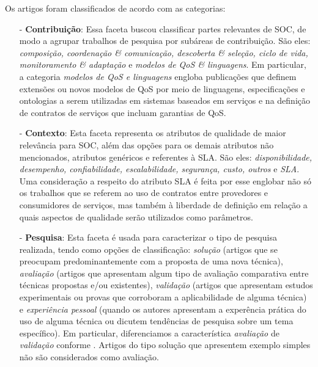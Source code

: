 Os artigos foram classificados de acordo com as categorias:
\begin{itemize}
\item[-] \textbf{Contribuição}: Essa faceta buscou classificar partes relevantes de SOC, de modo a agrupar trabalhos de pesquisa por subáreas de contribuição. São eles: \emph{composição, coordenação \& comunicação, descoberta \& seleção, ciclo de vida, monitoramento \& adaptação} e  \emph{modelos de QoS \& linguagens}. Em particular, a categoria \emph{modelos de QoS e linguagens} engloba publicações que definem extensões ou novos modelos de QoS por meio de linguagens, especificações e ontologias a serem utilizadas em sistemas baseados em serviços e na definição de contratos de serviços que incluam garantias de QoS.

\item[-] \textbf{Contexto}: Esta faceta representa os atributos de qualidade de maior relevância para SOC, além das opções para os demais atributos não mencionados, atributos genéricos e referentes à SLA. São eles: \emph{disponibilidade, desempenho, confiabilidade, escalabilidade, segurança, custo, outros} e \emph{SLA}. Uma consideração a respeito do atributo SLA é feita por esse englobar não só os trabalhos que se referem ao uso de contratos entre provedores e consumidores de serviços, mas também à liberdade de definição em relação a quais aspectos de qualidade serão utilizados como parâmetros.

\item[-] \textbf{Pesquisa}: Esta faceta \'{e} usada para caracterizar o tipo de pesquisa realizada, tendo como op\c c\~{o}es de classifica\c c\~{a}o: 
\emph{solu\c c\~{a}o} (artigos que se preocupam predominantemente com a proposta de uma nova t\'{e}cnica), \emph{avalia\c c\~{a}o} (artigos que apresentam 
algum tipo de avalia\c c\~{a}o comparativa entre t\'{e}cnicas propostas e/ou existentes), \emph{validação} (artigos que apresentam 
estudos experimentais ou provas que corroboram a aplicabilidade de alguma t\'{e}cnica) e \emph{experiência pessoal} (quando os autores 
apresentam a exper\^{e}ncia pr\'{a}tica do uso de alguma t\'{e}cnica ou dicutem tend\^{e}ncias de pesquisa sobre um tema espec\'{i}fico). Em particular, diferenciamos a caracter\'{i}stica \emph{avalia\c{c}\~{a}o} de \emph{valida\c{c}\~{a}o} conforme \cite{Wieringa:10.1007/s00766-005-0021-6}. Artigos do tipo solução que apresentem exemplo simples não são considerados como avaliação.
\end{itemize}


